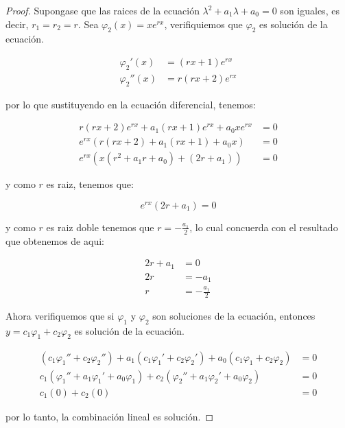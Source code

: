 		\begin{proof}
			Supongase que las raices de la ecuación $\lambda^2 + a_1 \lambda + a_0 = 0$ son iguales, es decir, $r_1 = r_2 = r$.
			Sea $\varphi_2(x) = x e^{rx}$, verifiquiemos que $\varphi_2$ es solución de la ecuación.

			\begin{align*}
				\varphi_2'(x) &= (rx + 1) e^{rx} \\
				\varphi_2''(x) &= r(rx + 2) e^{rx}
			\end{align*}

			por lo que sustituyendo en la ecuación diferencial, tenemos:

			\begin{align*}
				r (rx + 2) e^{rx} + a_1 (rx + 1) e^{rx} + a_0 x e^{rx} &= 0 \\
				e^{rx} (r (rx + 2) + a_1 (rx + 1) + a_0 x) &= 0 \\
				e^{rx} (x(r^2 + a_1 r + a_0) + (2r + a_1)) &= 0
			\end{align*}

			y como $r$ es raiz, tenemos que:

			\begin{equation*}
				e^{rx} (2r + a_1) = 0
			\end{equation*}

			y como $r$ es raiz doble tenemos que $r = -\frac{a_1}{2}$, lo cual concuerda con el resultado que obtenemos de aqui:

			\begin{align*}
				2r + a_1 &= 0 \\
				2r &= -a_1 \\
				r &= -\frac{a_1}{2}
			\end{align*}

			Ahora verifiquemos que si $\varphi_1$ y $\varphi_2$ son soluciones de la ecuación, entonces $y = c_1 \varphi_1 + c_2 \varphi_2$ es solución de la ecuación.

			\begin{align*}
				(c_1 \varphi_1'' + c_2 \varphi_2'') + a_1 (c_1 \varphi_1' + c_2 \varphi_2') + a_0 (c_1 \varphi_1 + c_2 \varphi_2) &= 0 \\
				c_1 (\varphi_1'' + a_1 \varphi_1' + a_0 \varphi_1) + c_2 (\varphi_2'' + a_1 \varphi_2' + a_0 \varphi_2) &= 0 \\
				c_1 (0) + c_2 (0) &= 0
			\end{align*}

			por lo tanto, la combinación lineal es solución.
		\end{proof}

